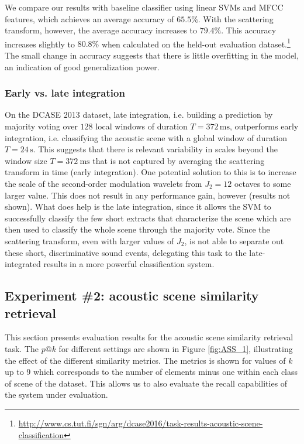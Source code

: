 \documentclass[journal]{IEEEtran}
\makeatletter
\newcommand*{\ie}{i.e.\@\xspace}
\newcommand*{\vs}{vs.\@\xspace}
\makeatother
\begin{document}
We compare our results with baseline classifier using linear SVMs and MFCC features, which achieves an average accuracy of $65.5\%$. With the scattering transform, however, the average accuracy increases to $79.4\%$. This accuracy increases slightly to $80.8\%$ when calculated on the held-out evaluation dataset.\footnote{\url{http://www.cs.tut.fi/sgn/arg/dcase2016/task-results-acoustic-scene-classification}} The small change in accuracy suggests that there is little overfitting in the model, an indication of good generalization power.

\subsubsection*{Early \vs late integration}
On the DCASE 2013 dataset, late integration, \ie building a prediction by majority voting over $128$ local windows of duration $T=372\,\mathrm{ms}$, outperforms early integration, \ie classifying the acoustic scene with a global window of duration $T=24\,\mathrm{s}$.
This suggests that there is relevant variability in scales beyond the window size $T = 372~\mathrm{ms}$ that is not captured by averaging the scattering transform in time (early integration). One potential solution to this is to increase the scale of the second-order modulation wavelets from $J_2 = 12$ octaves to some larger value. This does not result in any performance gain, however (results not shown). What does help is the late integration, since it allows the SVM to successfully classify the few short extracts that characterize the scene which are then used to classify the whole scene through the majority vote. Since the scattering transform, even with larger values of $J_2$, is not able to separate out these short, discriminative sound events, delegating this task to the late-integrated results in a more powerful classification system.

\subsection{Experiment \#2: acoustic scene similarity retrieval}

This section presents evaluation results for the acoustic scene similarity retrieval task. The $p@k$ for different settings are shown in Figure \ref{fig:ASS_1}, illustrating the effect of the different similarity metrics. The metrics is shown for values of $k$ up to 9 which corresponds to the number of elements minus one within each class of scene of the dataset. This allows us to also evaluate the recall capabilities of the system under evaluation.
\end{document}
